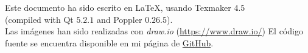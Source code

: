\vfill
\begin{flushright}
Este documento ha sido escrito en \LaTeX , usando Texmaker $4.5$ \\
(compiled with Qt $5.2.1$ and Poppler $0.26.5$).\\
Las imágenes han sido realizadas con \textit{draw.io} (\url{https://www.draw.io/})
El código fuente se encuentra disponible en mi página de \href{https://github.com/davidRetana/TFGLaTeX}{GitHub}.
\end{flushright}

\clearpage
